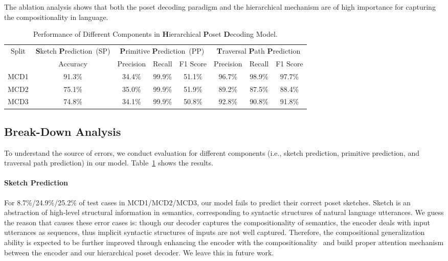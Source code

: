 \documentclass{article}
\begin{document}
The ablation analysis shows that both the poset decoding paradigm and the hierarchical mechanism are of high importance for capturing the compositionality in language.





\begin{table}
\small
\caption{Performance of Different Components in \textbf{H}ierarchical \textbf{P}oset \textbf{D}ecoding Model.}
\centering
\begin{tabular}{cccccccc}
\toprule[1pt]
 \multirow{2}{*}{Split}& \textbf{S}ketch \textbf{P}rediction~(SP) & \multicolumn{3}{c}{\textbf{P}rimitive \textbf{P}rediction~(PP)} & \multicolumn{3}{c}{\textbf{T}raversal \textbf{P}ath \textbf{P}rediction}~(TPP) \\
 \cline{2-8}
 & Accuracy & Precision & Recall &F1 Score  &Precision &Recall &F1 Score \\
\midrule 
MCD1 & 91.3\% & 34.4\% & 99.9\% &51.1\% & 96.7\% & 98.9\%& 97.7\%\\
\midrule
MCD2 & 75.1\%& 35.0\%& 99.9\% &51.9\% & 89.2\%& 87.5\% &88.4\%\\
\midrule
MCD3 &74.8\% & 34.1\%& 99.9\% & 50.8\% & 92.8\%& 90.8\%& 91.8\%\\
\bottomrule[1pt]
\end{tabular}
\label{tab:impact_res}
\end{table}

\subsection{Break-Down Analysis}
To understand the source of errors, we conduct evaluation for different components (i.e., sketch prediction, primitive prediction, and traversal path prediction) in our model.
Table~\ref{tab:impact_res} shows the results.


\paragraph{Sketch Prediction}
For 8.7\%/24.9\%/25.2\% of test cases in MCD1/MCD2/MCD3, our model fails to predict their correct poset sketches.
Sketch is an abstraction of high-level structural information in semantics, corresponding to syntactic structures of natural language utterances.
We guess the reason that causes these error cases is: though our decoder captures the compositionality of semantics, the encoder deals with input utterances as sequences, thus implicit syntactic structures of inputs are not well captured.
Therefore, the compositional generalization ability is expected to be further improved through enhancing the encoder with the compositionality~\citep{dyer2016recurrent,kim2019unsupervised,shen2018ordered} and build proper attention mechanism between the encoder and our hierarchical poset decoder.
We leave this in future work.
\end{document}
